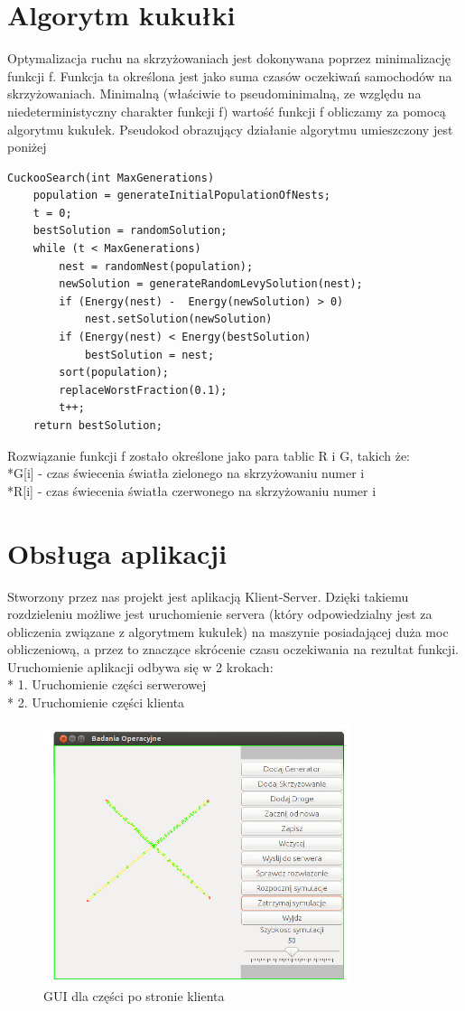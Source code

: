 \documentclass{article}
\begin{document}
\section{Algorytm kukułki}
    Optymalizacja ruchu na skrzyżowaniach jest dokonywana poprzez minimalizację funkcji f. Funkcja ta określona jest jako suma czasów oczekiwań samochodów na skrzyżowaniach. Minimalną (właściwie to pseudominimalną, ze względu na niedeterministyczny charakter funkcji f) wartość funkcji f 
obliczamy za pomocą algorytmu kukułek. Pseudokod obrazujący działanie algorytmu umieszczony jest poniżej

\begin{lstlisting}
CuckooSearch(int MaxGenerations)
    population = generateInitialPopulationOfNests;
    t = 0;
    bestSolution = randomSolution;
    while (t < MaxGenerations)
        nest = randomNest(population);
        newSolution = generateRandomLevySolution(nest);
        if (Energy(nest) -  Energy(newSolution) > 0)
            nest.setSolution(newSolution)
        if (Energy(nest) < Energy(bestSolution)
            bestSolution = nest;
        sort(population);
        replaceWorstFraction(0.1);
        t++;
    return bestSolution;
\end{lstlisting}

Rozwiązanie funkcji f zostało określone jako para tablic R i G, takich że: 
\\*G[i]  - czas świecenia światła zielonego na skrzyżowaniu numer i
\\*R[i]  - czas świecenia światła czerwonego na skrzyżowaniu numer i

\section{Obsługa aplikacji}
  Stworzony przez nas projekt jest aplikacją Klient-Server. Dzięki takiemu rozdzieleniu możliwe jest uruchomienie servera (który odpowiedzialny jest za obliczenia związane z algorytmem kukułek) na maszynie posiadającej duża moc obliczeniową, a przez to znaczące skrócenie czasu oczekiwania na rezultat funkcji. 
Uruchomienie aplikacji odbywa się w 2 krokach: \\*
1. Uruchomienie części serwerowej\\*
2. Uruchomienie części klienta

\begin{figure}[ht!]
\centering
\includegraphics[width=90mm]{gui.jpg}
\caption{GUI dla części po stronie klienta}
\label{overflow}
\end{figure}
\end{document}

